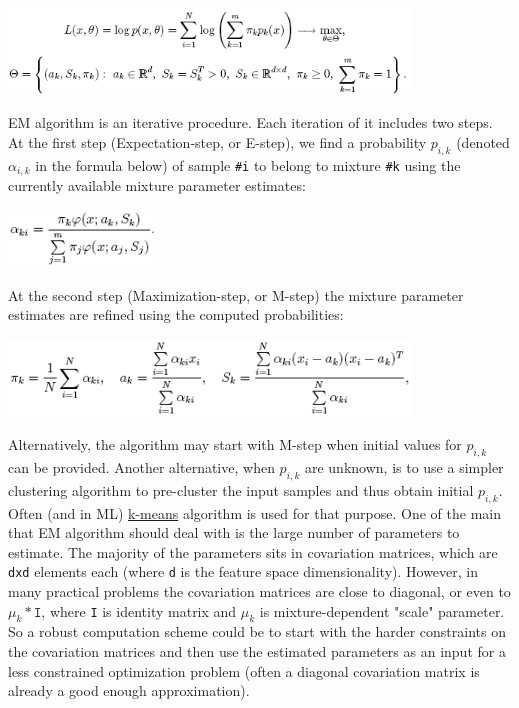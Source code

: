 \includegraphics[width=0.8\textwidth]{pics/em3.png}

EM algorithm is an iterative procedure. Each iteration of it includes two steps. At the first step (Expectation-step, or E-step), we find a probability $p_{i,k}$ (denoted $\alpha_{i,k}$ in the formula below) of sample \texttt{\#i} to belong to mixture \texttt{\#k} using the currently available mixture parameter estimates:

\includegraphics[width=0.3\textwidth]{pics/em4.png}

At the second step (Maximization-step, or M-step) the mixture parameter estimates are refined using the computed probabilities:

\includegraphics[width=0.8\textwidth]{pics/em5.png}

Alternatively, the algorithm may start with M-step when initial values for $p_{i,k}$ can be provided. Another alternative, when $p_{i,k}$ are unknown, is to use a simpler clustering algorithm to pre-cluster the input samples and thus obtain initial $p_{i,k}$. Often (and in ML) \href{CxCore#KMeans2}{k-means} algorithm is used for that purpose.
\newline
\newline
One of the main that EM algorithm should deal with is the large number of parameters to estimate. The majority of the parameters sits in covariation matrices, which are \texttt{dxd} elements each (where \texttt{d} is the feature space dimensionality). However, in many practical problems the covariation matrices are close to diagonal, or even to $\mu_k*\texttt{I}$, where \texttt{I} is identity matrix and $\mu_k$ is mixture-dependent "scale" parameter. So a robust computation scheme could be to start with the harder constraints on the covariation matrices and then use the estimated parameters as an input for a less constrained optimization problem (often a diagonal covariation matrix is already a good enough approximation).

